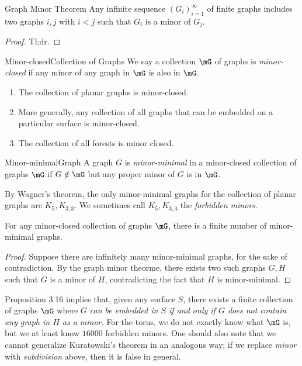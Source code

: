 \documentclass[co342]{subfiles}
\begin{document}
    \begin{theorem}{Graph Minor Theorem}
        Any infinite sequence $\left( G_{i} \right)^{\infty}_{i=1}$ of finite graphs includes two graphs $i,j$ with $i<j$ such that $G_i$ is a minor of $G_j$.
    \end{theorem}

    \begin{proof}
        Tl;dr.
    \end{proof}

    \begin{definition}{Minor-closed}{Collection of Graphs}
        We say a collection $\mG$ of graphs is \emph{minor-closed} if any minor of any graph in $\mG$ is also in $\mG$.
    \end{definition}

    \ex
    \begin{enumerate}
        \item The collection of planar graphs is minor-closed.
        \item More generally, any collection of all graphs that can be embedded on a particular surface is minor-closed.
        \item The collection of all forests is minor closed.
    \end{enumerate}
    
    \begin{definition}{Minor-minimal}{Graph}
        A graph $G$ is \emph{minor-minimal} in a minor-closed collection of graphs $\mG$ if $G\notin\mG$ but any proper minor of $G$ is in $\mG$.
    \end{definition}

    \ex By Wagner's theorem, the only minor-minimal graphs for the collection of planar graphs are $K_5, K_{3,3}$. We sometimes call $K_5, K_{3,3}$ the \textit{forbidden minors}.
    
    \begin{prop}{}
        For any minor-closed collection of graphs $\mG$, there is a finite number of minor-minimal graphs.
    \end{prop}

    \begin{proof}
        Suppose there are infinitely many minor-minimal graphs, for the sake of contradiction. By the graph minor theorme, there exists two such graphs $G,H$ such that $G$ is a minor of $H$, contradicting the fact that $H$ is minor-minimal.
    \end{proof}
    
    \np Proposition 3.16 implies that, given any surface $S$, there exists a finite collection of graphs $\mG$ where \textit{$G$ can be embedded in $S$ if and only if $G$ does not contain any graph in $H$ as a minor.} For the torus, we do not exactly know what $\mG$ is, but we at least know $16000$ forbidden minors. One should also note that we cannot generalize Kuratowski's theorem in an analogous way; if we replace \textit{minor} with \textit{subdivision} above, then it is false in general.
    
\end{document}
